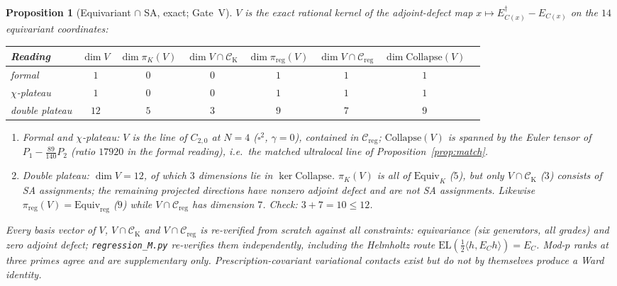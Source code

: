 \documentclass{article}
\newtheorem{proposition}{Proposition}
\theoremstyle{remark}
\newcommand{\Creg}{\mathcal C_{\mathrm{reg}}}
\newcommand{\Coll}{\mathrm{Collapse}}
\begin{document}
\begin{proposition}[Equivariant $\cap$ SA, exact; Gate~V]
\label{prop:M7-inter}
$V$ is the exact rational kernel of the adjoint-defect map $x\mapsto E_{C(x)}^\dagger-E_{C(x)}$ on the $14$ equivariant coordinates:
\begin{center}
\begin{tabular}{lccccccc}
\hline
Reading & $\dim V$ & $\dim\pi_K(V)$ & $\dim V\cap\mathcal C_{\mathrm K}$ & $\dim\pi_{\mathrm{reg}}(V)$ & $\dim V\cap\Creg$ & $\dim\Coll(V)$\\
\hline
formal & $1$ & $0$ & $0$ & $1$ & $1$ & $1$\\
$\chi$-plateau & $1$ & $0$ & $0$ & $1$ & $1$ & $1$\\
double plateau & $12$ & $5$ & $3$ & $9$ & $7$ & $9$\\
\hline
\end{tabular}
\end{center}
\begin{enumerate}
\item Formal and $\chi$-plateau: $V$ is the line of $C_{2,0}$ at $N=4$ ($\square^2$, $\gamma=0$), contained in $\Creg$; $\Coll(V)$ is spanned by the Euler tensor of $P_1-\tfrac{89}{140}P_2$ (ratio $17920$ in the formal reading), i.e.\ the matched ultralocal line of Proposition~\ref{prop:match}.
\item Double plateau: $\dim V=12$, of which $3$ dimensions lie in $\ker\Coll$.
$\pi_K(V)$ is all of $\mathrm{Equiv}_K$ ($5$), but only $V\cap\mathcal C_{\mathrm K}$ ($3$) consists of SA assignments; the remaining projected directions have nonzero adjoint defect and are \emph{not} SA assignments.
Likewise $\pi_{\mathrm{reg}}(V)=\mathrm{Equiv}_{\mathrm{reg}}$ ($9$) while $V\cap\Creg$ has dimension $7$.
Check: $3+7=10\le12$.
\end{enumerate}
Every basis vector of $V$, $V\cap\mathcal C_{\mathrm K}$ and $V\cap\Creg$ is re-verified from scratch against all constraints: equivariance (six generators, all grades) and zero adjoint defect; \texttt{regression\_M.py} re-verifies them independently, including the Helmholtz route $\mathrm{EL}(\tfrac12\langle h,E_Ch\rangle)=E_C$.
Mod-$p$ ranks at three primes agree and are supplementary only.
Prescription-covariant variational contacts exist but do not by themselves produce a Ward identity.
\end{proposition}
\end{document}

